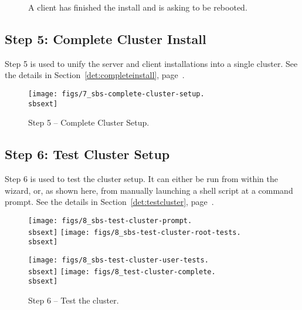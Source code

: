 \begin{figure}[h!]
  \begin{center}
    \centerline{
      }
    \caption{A client has finished the install and is asking to be
      rebooted.} 
    \label{fig:sbs-install-finish}
  \end{center}
\end{figure}



\clearpage
\subsection{Step 5: Complete Cluster Install} 

Step 5 is used to unify the server and client installations into a
single cluster.  See the details in Section~\ref{det:completeinstall},
page~\pageref{det:completeinstall}.

\begin{figure}[h!]
   \begin{center}
     \centerline{\texttt{[image: figs/7\_sbs-complete-cluster-setup.\\sbsext]}}
     \caption{Step 5 -- Complete Cluster Setup.}
     \label{fig:sbs-install-wizard-s5}
   \end{center}
 \end{figure}



\subsection{Step 6: Test Cluster Setup}

Step 6 is used to test the cluster setup.  It can either be run from
within the wizard, or, as shown here, from manually launching a shell
script at a  command prompt.  See the details in
Section~\ref{det:testcluster}, page~\pageref{det:testcluster}.

\begin{figure}[h!]
  \begin{center}
    \centerline{
      \texttt{[image: figs/8\_sbs-test-cluster-prompt.\\sbsext]}
      \hspace{\imghskip}
      \texttt{[image: figs/8\_sbs-test-cluster-root-tests.\\sbsext]}
      }
    \vspace{\imgvskip}
    \centerline{
      \texttt{[image: figs/8\_sbs-test-cluster-user-tests.\\sbsext]}
      \hspace{\imghskip}
      \texttt{[image: figs/8\_test-cluster-complete.\\sbsext]}
      }
    \caption{Step 6 -- Test the cluster.}
    \label{fig:sbs-setup-test}
  \end{center}
\end{figure}


